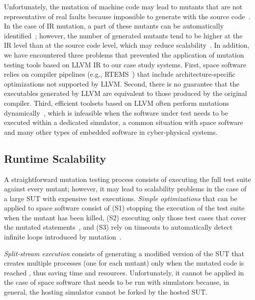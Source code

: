 Unfortunately, the mutation of machine code 
may lead to mutants that are not representative of real faults because impossible to generate with the source code~\cite{schuler2009efficient}.
In the case of IR mutation, a part of these mutants can be automatically identified~\cite{denisov2018mull}; however,
the number of generated mutants tend to be higher at the IR level than at the source code level, which may reduce scalability~\cite{hariri2019comparing}.
 In addition, we have encountered three problems that prevented the application of 
 mutation testing tools based on  LLVM IR to our case study systems.
First, space software relies on compiler pipelines (e.g., RTEMS~\cite{RTEMS}) that include architecture-specific optimizations not supported by LLVM. 
Second, there is no guarantee that the executables generated by LLVM are equivalent to those produced by the original compiler.
 Third, efficient toolsets based on LLVM often  perform mutations dynamically~\cite{denisov2018mull}, which is infeasible when the software under test needs to be executed within a dedicated simulator, a common situation with space software and many other types of embedded software in cyber-physical systems.




\subsection{Runtime Scalability}
\label{sec:scalability}

A straightforward mutation testing process consists of executing the full test suite against every mutant; however, it may lead to scalability problems in the case of a large SUT with expensive test executions.
\emph{Simple optimizations} that can be applied to space software consist of (S1) stopping the execution of the test suite when the mutant has been killed, (S2) executing only those test cases that cover the mutated statements~\cite{delamaro1996proteum}, and (S3) rely on timeouts to automatically detect infinite loops introduced by mutation~\cite{papadakis2019mutation}. 

\emph{Split-stream execution} consists of generating a modified version of the SUT that creates multiple processes (one for each mutant) only when the mutated code is reached \cite{king1991fortran,tokumoto2016muvm}, thus saving time and resources. Unfortunately, it cannot be applied in the case of space software that needs to be run with simulators because, in general, the hosting simulator cannot be forked by the hosted SUT.

